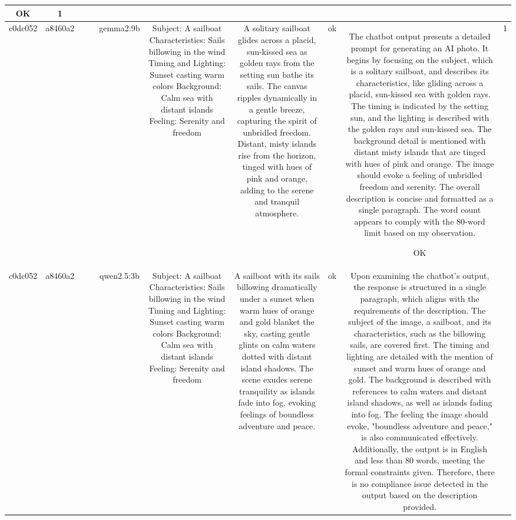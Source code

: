 \begin{table}[h!]
\begin{tabular}{|c|c|c|c|c|c|c|c|c|c|}
OK & 1\\
\hline
c0dc052 & a8460a2 &  &  & gemma2:9b & Subject: A sailboat  
Characteristics: Sails billowing in the wind  
Timing and Lighting: Sunset casting warm colors  
Background: Calm sea with distant islands  
Feeling: Serenity and freedom & A solitary sailboat glides across a placid, sun-kissed sea as golden rays from the setting sun bathe its sails. The canvas ripples dynamically in a gentle breeze, capturing the spirit of unbridled freedom. Distant, misty islands rise from the horizon, tinged with hues of pink and orange, adding to the serene and tranquil atmosphere.   
 & ok & The chatbot output presents a detailed prompt for generating an AI photo. It begins by focusing on the subject, which is a solitary sailboat, and describes its characteristics, like gliding across a placid, sun-kissed sea with golden rays. The timing is indicated by the setting sun, and the lighting is described with the golden rays and sun-kissed sea. The background detail is mentioned with distant misty islands that are tinged with hues of pink and orange. The image should evoke a feeling of unbridled freedom and serenity. The overall description is concise and formatted as a single paragraph. The word count appears to comply with the 80-word limit based on my observation.

OK & 1\\
\hline
c0dc052 & a8460a2 &  &  & qwen2.5:3b & Subject: A sailboat  
Characteristics: Sails billowing in the wind  
Timing and Lighting: Sunset casting warm colors  
Background: Calm sea with distant islands  
Feeling: Serenity and freedom & A sailboat with its sails billowing dramatically under a sunset when warm hues of orange and gold blanket the sky, casting gentle glints on calm waters dotted with distant island shadows. The scene exudes serene tranquility as islands fade into fog, evoking feelings of boundless adventure and peace. & ok & Upon examining the chatbot's output, the response is structured in a single paragraph, which aligns with the requirements of the description. The subject of the image, a sailboat, and its characteristics, such as the billowing sails, are covered first. The timing and lighting are detailed with the mention of sunset and warm hues of orange and gold. The background is described with references to calm waters and distant island shadows, as well as islands fading into fog. The feeling the image should evoke, "boundless adventure and peace," is also communicated effectively. Additionally, the output is in English and less than 80 words, meeting the formal constraints given. Therefore, there is no compliance issue detected in the output based on the description provided.


\end{tabular}
\end{table}
